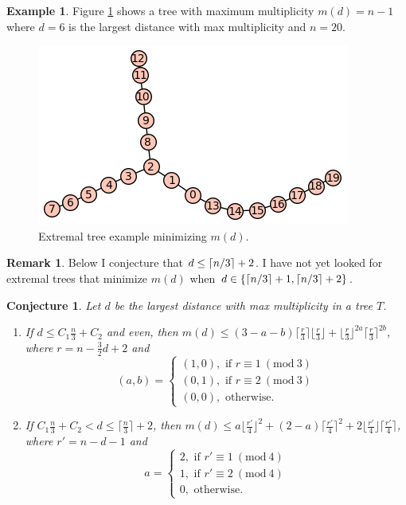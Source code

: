 \documentclass[12]{article}
\newcommand{\Mod}[1]{\ (\mathrm{mod}\ #1)}
\DeclarePairedDelimiter\ceil{\lceil}{\rceil}
\newtheorem{conj}[thm]{Conjecture}
\theoremstyle{definition}
\newtheorem{eg}{Example}
\newtheorem{rem}[thm]{Remark}
\begin{document}
	\begin{eg}
		Figure \ref{Figure-ExtremalTreeExampleMinimizingMultiplicity} shows a tree with maximum multiplicity $m(d) = n-1$ where $d=6$ is the largest distance with max multiplicity and $n = 20$.
		\begin{figure}[h]
			\centering
			\includegraphics[scale=0.65]{ExtremalTreeExample3(min).png}
			\caption{Extremal tree example minimizing $m(d)$.}\label{Figure-ExtremalTreeExampleMinimizingMultiplicity}
		\end{figure}
	\end{eg}

	\begin{rem}
		Below I conjecture that $d \leq \ceil{n/3}+2$.  I have not yet looked for extremal trees that minimize $m(d)$ when $d \in \{\ceil{n/3}+1, \ceil{n/3}+2\}$.
	\end{rem}
	\newpage
	\begin{conj}
		Let $d$ be the largest distance with max multiplicity in a tree $T$.  
		\begin{enumerate}
			\item If $d \leq C_1\frac{n}{3} + C_2$ and even, then $m(d) \leq (3-a-b)\lceil \frac{r}{3} \rceil \lfloor \frac{r}{3} \rfloor + \lfloor \frac{r}{3} \rfloor^{2a} \lceil \frac{r}{3} \rceil^{2b}$, where $r = n-\tfrac{3}{2}d+2$ and 
			$$(a,b) = \begin{cases}
				(1,0), \text{ if } r \equiv 1 \Mod{3}	\\
				(0,1), \text{ if } r \equiv 2 \Mod{3}	\\
				(0,0), \text{ otherwise. }
			\end{cases}$$
			
			\item If $C_1\frac{n}{3} +C_2< d \leq \lceil \tfrac{n}{3} \rceil + 2$, then $m(d) \leq a\lfloor \frac{r'}{4} \rfloor^2 + (2-a)\lceil \frac{r'}{4} \rceil^2 + 2\lfloor\frac{r'}{4} \rfloor \lceil\frac{r'}{4} \rceil$, where $r' = n-d-1$ and 
			$$a = \begin{cases}
				2, \text{ if } r' \equiv 1 \Mod{4}	\\
				1, \text{ if } r' \equiv 2 \Mod{4}	\\
				0, \text{ otherwise. }
			\end{cases}$$
		\end{enumerate}
	\end{conj}
	
\end{document}

